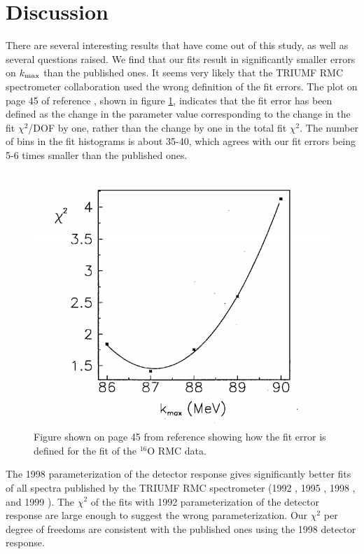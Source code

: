 \documentclass[12pt]{article}
\newcommand {\kmax}         {\mbox{$k_{\rm max}$}}
\begin{document}



\section { Discussion }
There are several interesting results that have come out of this study, as well as several
questions raised. We find that our fits result in significantly
smaller errors on $\kmax$ than the published ones. It seems very likely that the TRIUMF 
RMC spectrometer collaboration used the wrong definition of the fit errors. The plot on 
page 45 of reference \cite{BERGBISH_MS_THESIS}, shown in figure \ref{fig:BergbuschChiSq}, 
indicates that the fit error has been defined as the change in the parameter value
corresponding to the change in the fit $\chi^2$/DOF by one, rather than the change
by one in the total fit $\chi^2$. The number of bins in the fit histograms
is about 35-40, which agrees with our fit errors being 5-6 times smaller than
the published ones.


  \begin{figure}[h]
    \centering
    \includegraphics[width=0.8\linewidth]{figures/png/Bergbusch_O16_chisq_plot.png}
    \caption{Figure shown on page 45 from reference \cite{BERGBISH_MS_THESIS} showing
    how the fit error is defined for the fit of the $^{16}$O RMC data. }
    \label{fig:BergbuschChiSq}
  \end{figure}

The 1998 parameterization of the detector response gives significantly better
fits of all spectra published by the TRIUMF RMC spectrometer (1992 \cite{RMC_1992_PhysRevC.46.1094},
1995 \cite{BERGBISH_MS_THESIS}, 1998 \cite{RMC_1998_PhysRevC.58.1767}, and 
1999 \cite{RMC_1999_PhysRevC.59.2853}).
The $\chi^2$ of the fits with 1992 parameterization of the detector response are large enough
to suggest the wrong parameterization. Our $\chi^2$ per degree of freedoms are consistent with
the published ones using the 1998 detector response.
\end{document}
